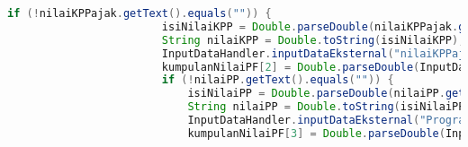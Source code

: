 \begin{lstlisting}[language=Java, caption=TampilanKondisiEksternal.java]
                    if (!nilaiKPPajak.getText().equals("")) {
                        isiNilaiKPP = Double.parseDouble(nilaiKPPajak.getText()) / 100.0;
                        String nilaiKPP = Double.toString(isiNilaiKPP);
                        InputDataHandler.inputDataEksternal("nilaiKPPajak", nilaiKPP);
                        kumpulanNilaiPF[2] = Double.parseDouble(InputDataHandler.getValue("nilaiKPPajak"));
                        if (!nilaiPP.getText().equals("")) {
                            isiNilaiPP = Double.parseDouble(nilaiPP.getText()) / 100.0;
                            String nilaiPP = Double.toString(isiNilaiPP);
                            InputDataHandler.inputDataEksternal("ProgramPemerintah", nilaiPP);
                            kumpulanNilaiPF[3] = Double.parseDouble(InputDataHandler.getValue("ProgramPemerintah"));


\end{lstlisting}

